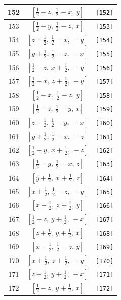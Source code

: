 \documentclass[fleqn,8pt]{jsarticle}
\begin{document}
\begin{longtable}{ccc}
152 & $\left[ \frac{1}{2} - z,\, \frac{1}{2} - x,\, y \right]$ & {\tt [152]} \\ \hline
153 & $\left[ \frac{1}{2} - y,\, \frac{1}{2} - z,\, x \right]$ & {\tt [153]} \\ \hline
154 & $\left[ z + \frac{1}{2},\, \frac{1}{2} - x,\, - y \right]$ & {\tt [154]} \\ \hline
155 & $\left[ y + \frac{1}{2},\, \frac{1}{2} - z,\, - x \right]$ & {\tt [155]} \\ \hline
156 & $\left[ \frac{1}{2} - z,\, x + \frac{1}{2},\, - y \right]$ & {\tt [156]} \\ \hline
157 & $\left[ \frac{1}{2} - x,\, z + \frac{1}{2},\, - y \right]$ & {\tt [157]} \\ \hline
158 & $\left[ \frac{1}{2} - x,\, \frac{1}{2} - z,\, y \right]$ & {\tt [158]} \\ \hline
159 & $\left[ \frac{1}{2} - z,\, \frac{1}{2} - y,\, x \right]$ & {\tt [159]} \\ \hline
160 & $\left[ z + \frac{1}{2},\, \frac{1}{2} - y,\, - x \right]$ & {\tt [160]} \\ \hline
161 & $\left[ y + \frac{1}{2},\, \frac{1}{2} - x,\, - z \right]$ & {\tt [161]} \\ \hline
162 & $\left[ \frac{1}{2} - y,\, x + \frac{1}{2},\, - z \right]$ & {\tt [162]} \\ \hline
163 & $\left[ \frac{1}{2} - y,\, \frac{1}{2} - x,\, z \right]$ & {\tt [163]} \\ \hline
164 & $\left[ y + \frac{1}{2},\, x + \frac{1}{2},\, z \right]$ & {\tt [164]} \\ \hline
165 & $\left[ x + \frac{1}{2},\, \frac{1}{2} - z,\, - y \right]$ & {\tt [165]} \\ \hline
166 & $\left[ x + \frac{1}{2},\, z + \frac{1}{2},\, y \right]$ & {\tt [166]} \\ \hline
167 & $\left[ \frac{1}{2} - z,\, y + \frac{1}{2},\, - x \right]$ & {\tt [167]} \\ \hline
168 & $\left[ z + \frac{1}{2},\, y + \frac{1}{2},\, x \right]$ & {\tt [168]} \\ \hline
169 & $\left[ x + \frac{1}{2},\, \frac{1}{2} - z,\, y \right]$ & {\tt [169]} \\ \hline
170 & $\left[ x + \frac{1}{2},\, z + \frac{1}{2},\, - y \right]$ & {\tt [170]} \\ \hline
171 & $\left[ z + \frac{1}{2},\, y + \frac{1}{2},\, - x \right]$ & {\tt [171]} \\ \hline
172 & $\left[ \frac{1}{2} - z,\, y + \frac{1}{2},\, x \right]$ & {\tt [172]} \\ \hline

\end{longtable}
\end{document}
